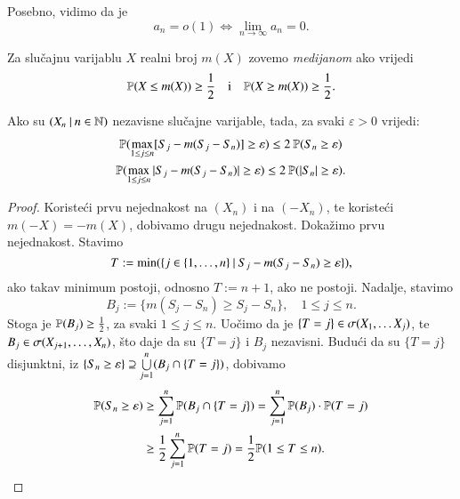 Posebno, vidimo da je
\begin{equation*}
    a_n = o(1) \iff \lim\limits_{n \to \infty} a_n = 0.
\end{equation*}

\begin{defn}    \label{defn:12.7-1}
    Za slu\v cajnu varijablu $X$ realni broj $m(X)$ zovemo \emph{medijanom} ako vrijedi
    \begin{equation*}
        \mathbb{P}({X \leq m(X)}) \geq \frac{1}{2} \quad \textnormal{i} \quad \mathbb{P}({X \geq m(X)}) \geq \frac{1}{2}.
    \end{equation*}
\end{defn}

\begin{lm}  \label{lm:12.8}
    Ako su $({X_n} \: | \: {n \in \mathbb{N}})$ nezavisne slu\v cajne varijable, tada, za svaki $\varepsilon > 0$ vrijedi:
    \begin{equation*}
        \begin{gathered}
            \mathbb{P}({\max\limits_{1 \leq j \leq n} [S_j - m(S_j - S_n)] \geq \varepsilon }) \leq 2 \: \mathbb{P}({S_n \geq \varepsilon})\\
            \mathbb{P}({\max\limits_{1 \leq j \leq n} |S_j - m(S_j - S_n)| \geq \varepsilon }) \leq 2 \: \mathbb{P}({|S_n| \geq \varepsilon}).
        \end{gathered}
    \end{equation*}
\end{lm}

\begin{proof}
    Koriste\' ci prvu nejednakost na $(X_n)$ i na $(-X_n)$, te koriste\' ci $m(-X) = -m(X)$, dobivamo drugu nejednakost.
    Doka\v zimo prvu nejednakost.
    Stavimo
    \begin{equation*}
        T:= \min ( \{{j \in \{1, \ldots, n\}} \: | \: {S_j - m(S_j - S_n) \geq \varepsilon}\} ),
    \end{equation*}
    ako takav minimum postoji, odnosno $T:= n + 1$, ako ne postoji.
    Nadalje, stavimo
    \begin{equation*}
        B_j := \{ m(S_j - S_n) \geq S_j - S_n \}, \quad 1 \leq j \leq n.
    \end{equation*}
    Stoga je $\mathbb{P}({B_j}) \geq \frac{1}{2}$, za svaki $1 \leq j \leq n$.
    Uo\v cimo da je $\{ T = j \} \in \sigma({X_1, \ldots X_j})$, te $B_j \in \sigma({X_{j + 1}, \ldots, X_n})$, \v sto daje da su $\{T = j\}$ i $B_j$ nezavisni.
    Budu\' ci da su $\{T = j\}$ disjunktni, iz $\{ S_n \geq \varepsilon \} \supseteq \bigcup\limits_{j = 1}^{n} (B_j \cap \{ T = j \})$, dobivamo
    \begin{equation*}
        \begin{aligned}
            \mathbb{P}({S_n \geq \varepsilon}) &\geq \sum\limits_{j = 1}^{n} \mathbb{P}({B_j \cap \{ T = j \}}) = \sum\limits_{j = 1}^{n} \mathbb{P}({B_j}) \cdot \mathbb{P}({T = j})\\
            &\geq \frac{1}{2} \sum\limits_{j = 1}^{n} \mathbb{P}({T = j}) = \frac{1}{2} \mathbb{P}({1 \leq T \leq n}).
        \end{aligned}
    \end{equation*}
\end{proof}

